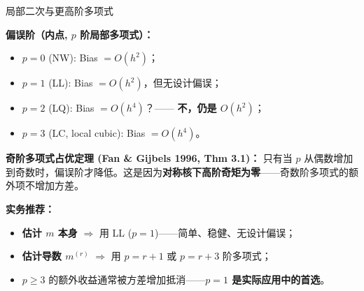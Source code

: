 \documentclass[aspectratio=169, 10pt]{beamer}
\begin{document}
\begin{frame}{局部二次与更高阶多项式}

  \textbf{偏误阶（内点, $p$ 阶局部多项式）：}
  \begin{itemize}
    \item $p=0$ (NW): Bias $= O(h^2)$；
    \item $p=1$ (LL): Bias $= O(h^2)$，但无设计偏误；
    \item $p=2$ (LQ): Bias $= O(h^4)$？—— \textbf{不，仍是 $O(h^2)$}；
    \item $p=3$ (LC, local cubic): Bias $= O(h^4)$。
  \end{itemize}

  \begin{highlightbox}
    \textbf{奇阶多项式占优定理 (Fan \& Gijbels 1996, Thm 3.1)：}
    只有当 $p$ 从偶数增加到奇数时，偏误阶才降低。这是因为\textbf{对称核下高阶奇矩为零}——奇数阶多项式的额外项不增加方差。
  \end{highlightbox}


  \begin{keybox}
    \textbf{实务推荐：}
    \begin{itemize}
      \item \textbf{估计 $m$ 本身} $\Rightarrow$ 用 LL ($p=1$)——简单、稳健、无设计偏误；
      \item \textbf{估计导数 $m^{(r)}$} $\Rightarrow$ 用 $p=r+1$ 或 $p=r+3$ 阶多项式；
      \item $p\geq 3$ 的额外收益通常被方差增加抵消——\textbf{$p=1$ 是实际应用中的首选}。
    \end{itemize}
  \end{keybox}

\end{frame}
\end{document}
